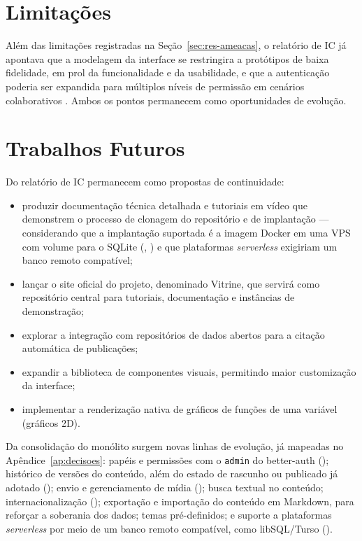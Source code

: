\section{Limitações}\label{sec:limitacoes-finais}

Além das limitações registradas na Seção~\ref{sec:res-ameacas}, o relatório de IC já apontava que a modelagem da interface se restringira a protótipos de baixa fidelidade, em prol da funcionalidade e da usabilidade, e que a autenticação poderia ser expandida para múltiplos níveis de permissão em cenários colaborativos \cite{reis2026ic}. Ambos os pontos permanecem como oportunidades de evolução.

\section{Trabalhos Futuros}\label{sec:trabalhos-futuros}

Do relatório de IC \cite{reis2026ic} permanecem como propostas de continuidade:

\begin{itemize}
  \item produzir documentação técnica detalhada e tutoriais em vídeo que demonstrem o processo de clonagem do repositório e de implantação --- considerando que a implantação suportada é a imagem Docker em uma VPS com volume para o SQLite (, ) e que plataformas \emph{serverless} exigiriam um banco remoto compatível;
  \item lançar o site oficial do projeto, denominado Vitrine, que servirá como repositório central para tutoriais, documentação e instâncias de demonstração;
  \item explorar a integração com repositórios de dados abertos para a citação automática de publicações;
  \item expandir a biblioteca de componentes visuais, permitindo maior customização da interface;
  \item implementar a renderização nativa de gráficos de funções de uma variável (gráficos 2D).
\end{itemize}

Da consolidação do monólito surgem novas linhas de evolução, já mapeadas no Apêndice~\ref{ap:decisoes}: papéis e permissões com o  \texttt{admin} do better-auth (); histórico de versões do conteúdo, além do estado de rascunho ou publicado já adotado (); envio e gerenciamento de mídia (); busca textual no conteúdo; internacionalização (); exportação e importação do conteúdo em Markdown, para reforçar a soberania dos dados; temas pré-definidos; e suporte a plataformas \emph{serverless} por meio de um banco remoto compatível, como libSQL/Turso ().

